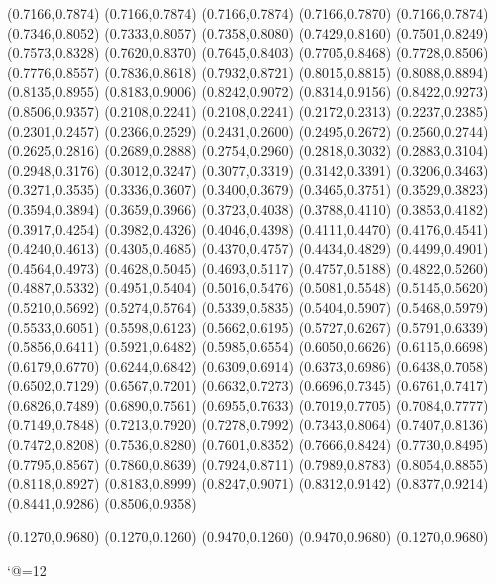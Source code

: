 \PST@Diamond(0.7166,0.7874)
\PST@Diamond(0.7166,0.7874)
\PST@Diamond(0.7166,0.7874)
\PST@Diamond(0.7166,0.7870)
\PST@Diamond(0.7166,0.7874)
\PST@Diamond(0.7346,0.8052)
\PST@Diamond(0.7333,0.8057)
\PST@Diamond(0.7358,0.8080)
\PST@Diamond(0.7429,0.8160)
\PST@Diamond(0.7501,0.8249)
\PST@Diamond(0.7573,0.8328)
\PST@Diamond(0.7620,0.8370)
\PST@Diamond(0.7645,0.8403)
\PST@Diamond(0.7705,0.8468)
\PST@Diamond(0.7728,0.8506)
\PST@Diamond(0.7776,0.8557)
\PST@Diamond(0.7836,0.8618)
\PST@Diamond(0.7932,0.8721)
\PST@Diamond(0.8015,0.8815)
\PST@Diamond(0.8088,0.8894)
\PST@Diamond(0.8135,0.8955)
\PST@Diamond(0.8183,0.9006)
\PST@Diamond(0.8242,0.9072)
\PST@Diamond(0.8314,0.9156)
\PST@Diamond(0.8422,0.9273)
\PST@Diamond(0.8506,0.9357)
\PST@Dashed(0.2108,0.2241)
(0.2108,0.2241)
(0.2172,0.2313)
(0.2237,0.2385)
(0.2301,0.2457)
(0.2366,0.2529)
(0.2431,0.2600)
(0.2495,0.2672)
(0.2560,0.2744)
(0.2625,0.2816)
(0.2689,0.2888)
(0.2754,0.2960)
(0.2818,0.3032)
(0.2883,0.3104)
(0.2948,0.3176)
(0.3012,0.3247)
(0.3077,0.3319)
(0.3142,0.3391)
(0.3206,0.3463)
(0.3271,0.3535)
(0.3336,0.3607)
(0.3400,0.3679)
(0.3465,0.3751)
(0.3529,0.3823)
(0.3594,0.3894)
(0.3659,0.3966)
(0.3723,0.4038)
(0.3788,0.4110)
(0.3853,0.4182)
(0.3917,0.4254)
(0.3982,0.4326)
(0.4046,0.4398)
(0.4111,0.4470)
(0.4176,0.4541)
(0.4240,0.4613)
(0.4305,0.4685)
(0.4370,0.4757)
(0.4434,0.4829)
(0.4499,0.4901)
(0.4564,0.4973)
(0.4628,0.5045)
(0.4693,0.5117)
(0.4757,0.5188)
(0.4822,0.5260)
(0.4887,0.5332)
(0.4951,0.5404)
(0.5016,0.5476)
(0.5081,0.5548)
(0.5145,0.5620)
(0.5210,0.5692)
(0.5274,0.5764)
(0.5339,0.5835)
(0.5404,0.5907)
(0.5468,0.5979)
(0.5533,0.6051)
(0.5598,0.6123)
(0.5662,0.6195)
(0.5727,0.6267)
(0.5791,0.6339)
(0.5856,0.6411)
(0.5921,0.6482)
(0.5985,0.6554)
(0.6050,0.6626)
(0.6115,0.6698)
(0.6179,0.6770)
(0.6244,0.6842)
(0.6309,0.6914)
(0.6373,0.6986)
(0.6438,0.7058)
(0.6502,0.7129)
(0.6567,0.7201)
(0.6632,0.7273)
(0.6696,0.7345)
(0.6761,0.7417)
(0.6826,0.7489)
(0.6890,0.7561)
(0.6955,0.7633)
(0.7019,0.7705)
(0.7084,0.7777)
(0.7149,0.7848)
(0.7213,0.7920)
(0.7278,0.7992)
(0.7343,0.8064)
(0.7407,0.8136)
(0.7472,0.8208)
(0.7536,0.8280)
(0.7601,0.8352)
(0.7666,0.8424)
(0.7730,0.8495)
(0.7795,0.8567)
(0.7860,0.8639)
(0.7924,0.8711)
(0.7989,0.8783)
(0.8054,0.8855)
(0.8118,0.8927)
(0.8183,0.8999)
(0.8247,0.9071)
(0.8312,0.9142)
(0.8377,0.9214)
(0.8441,0.9286)
(0.8506,0.9358)

\PST@Border(0.1270,0.9680)
(0.1270,0.1260)
(0.9470,0.1260)
(0.9470,0.9680)
(0.1270,0.9680)

\catcode`@=12
\fi
\endpspicture
